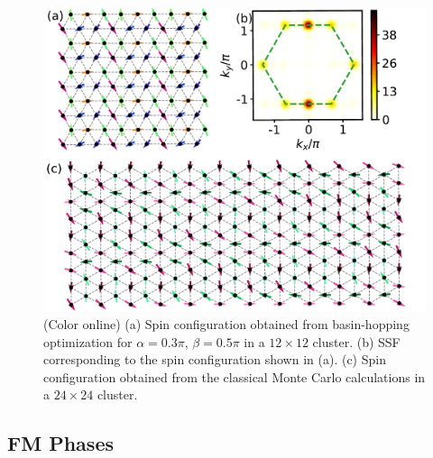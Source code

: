 \documentclass[aps,prb,reprint,amsfonts,amsmath,amssymb,showpacs,groupedaddress,superscriptaddress]{revtex4-1}
\begin{document}
\begin{figure}
    \centering
    \includegraphics[width=0.95\columnwidth]{ModulatedStripe.pdf}
    \caption{\label{fig:ModulatedStripe}(Color online) (a) Spin configuration obtained from basin-hopping optimization for $\alpha=0.3\pi$, $\beta=0.5\pi$ in a $12 \times 12$ cluster. (b) SSF corresponding to the spin configuration shown in (a). (c) Spin configuration obtained from the classical Monte Carlo calculations in a $24 \times 24$ cluster.}
\end{figure}

\subsection{\label{subsec:FMPhases}FM Phases}
\end{document}
